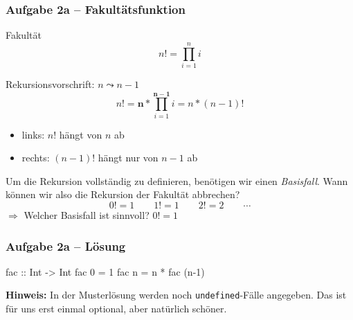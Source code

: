 \documentclass{beamer}
\begin{document}
	\begin{frame}\frametitle{Aufgabe 2a -- Fakultätsfunktion}
		\footnotesize
		Fakultät
		\begin{equation*}
			n! = \prod_{i=1}^n i
		\end{equation*}
		
		\medskip
		\pause
		
		Rekursionsvorschrift: $n \leadsto n-1$ \pause
		\begin{equation*}
			n! = \boldsymbol{n} * \prod_{i=1}^{\boldsymbol{n-1}} i= n * (n-1)!
		\end{equation*}
		\begin{itemize}
			\item links: $n!$ hängt von $n$ ab
			\item rechts: $(n-1)!$ hängt nur von $n-1$ ab
		\end{itemize}
		
		\medskip
		\pause
		
		Um die Rekursion vollständig zu definieren, benötigen wir einen \textit{Basisfall}. Wann können wir also die Rekursion der Fakultät abbrechen?
		\begin{equation*}
			0 ! = 1 \qquad 1 ! = 1 \qquad 2! = 2 \qquad \cdots
		\end{equation*}
		$\Rightarrow$ Welcher Basisfall ist sinnvoll? \qquad $0! = 1$
	\end{frame}

	\begin{frame}[fragile] \frametitle{Aufgabe 2a -- Lösung}
		\begin{codebox}
fac :: Int -> Int
fac 0 = 1
fac n = n * fac (n-1)
		\end{codebox}
		
		\scriptsize
		\textbf{Hinweis:} In der Musterlösung werden noch \texttt{undefined}-Fälle angegeben. Das ist für uns erst einmal optional, aber natürlich schöner.
	\end{frame}
\end{document}
